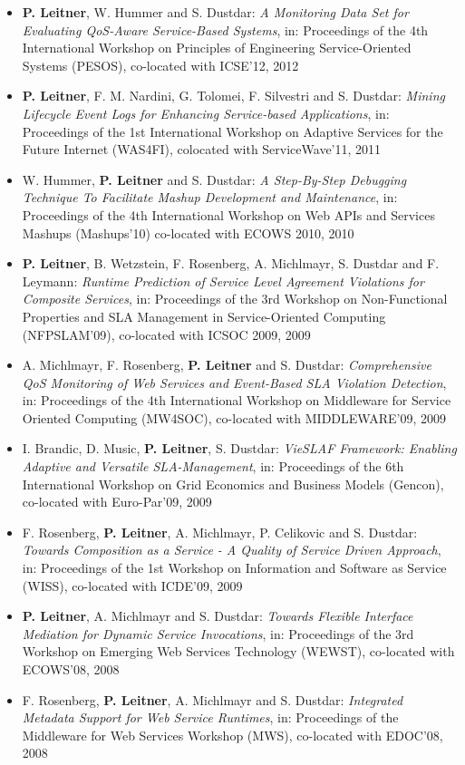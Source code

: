 \documentclass[paper=letter,fontsize=11pt]{scrartcl} %
\begin{document}
\begin{itemize}
\item \textbf{P. Leitner}, W. Hummer and S. Dustdar:
\emph{A Monitoring Data Set for Evaluating QoS-Aware Service-Based Systems}, in: Proceedings of the 4th International Workshop on Principles of Engineering Service-Oriented Systems (PESOS), co-located with ICSE'12, 2012
\item \textbf{P. Leitner}, F. M. Nardini, G. Tolomei, F. Silvestri
and S. Dustdar: \emph{Mining Lifecycle Event Logs for Enhancing
Service-based Applications}, in: Proceedings of the 1st International Workshop on Adaptive Services
for the Future Internet (WAS4FI), colocated with ServiceWave'11, 2011
\item W. Hummer, \textbf{P. Leitner} and S. Dustdar: \emph{A Step-By-Step Debugging Technique To Facilitate Mashup Development and Maintenance}, in: Proceedings of the 4th International Workshop on Web APIs and Services Mashups (Mashups'10) co-located with ECOWS 2010, 2010
\item \textbf{P. Leitner}, B. Wetzstein, F. Rosenberg, A. Michlmayr, S. Dustdar and F. Leymann: \emph{Runtime Prediction of Service Level Agreement Violations for Composite Services}, in: Proceedings of the 3rd Workshop on Non-Functional Properties and SLA Management in Service-Oriented Computing (NFPSLAM'09), co-located with ICSOC 2009, 2009
\item A. Michlmayr, F. Rosenberg, \textbf{P. Leitner} and S. Dustdar: \emph{Comprehensive QoS Monitoring of Web Services and Event-Based SLA Violation Detection}, in: Proceedings of the 4th International Workshop on Middleware for Service Oriented Computing (MW4SOC), co-located with MIDDLEWARE'09, 2009
\item I. Brandic, D. Music, \textbf{P. Leitner}, S. Dustdar: \emph{VieSLAF Framework: Enabling Adaptive and Versatile SLA-Management}, in: Proceedings of the 6th International Workshop on Grid Economics and Business Models (Gencon), co-located with Euro-Par'09, 2009
\item F. Rosenberg, \textbf{P. Leitner}, A. Michlmayr, P. Celikovic and S. Dustdar: \emph{Towards Composition as a Service - A Quality of Service Driven Approach}, in: Proceedings of the 1st Workshop on Information and Software as Service (WISS), co-located with ICDE'09, 2009
\item \textbf{P. Leitner}, A. Michlmayr and S. Dustdar: \emph{Towards Flexible Interface Mediation for Dynamic Service Invocations}, in: Proceedings of the 3rd Workshop on Emerging Web Services Technology (WEWST), co-located with ECOWS'08, 2008
\item F. Rosenberg, \textbf{P. Leitner}, A. Michlmayr and S. Dustdar: \emph{Integrated Metadata Support for Web Service Runtimes}, in: Proceedings of the Middleware for Web Services Workshop (MWS), co-located with EDOC'08, 2008
\end{itemize}
\end{document}

